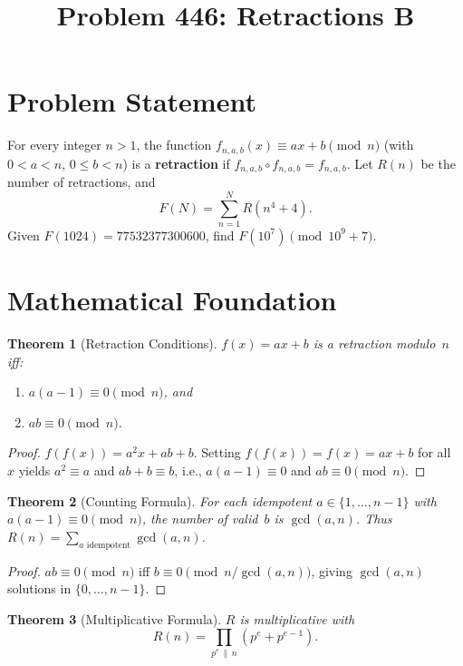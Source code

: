 \documentclass[12pt]{article}
\title{Problem 446: Retractions B}
\author{}
\date{}
\newtheorem{theorem}{Theorem}
\begin{document}
\maketitle

\section{Problem Statement}
For every integer $n > 1$, the function $f_{n,a,b}(x) \equiv ax + b \pmod{n}$ (with $0 < a < n$, $0 \le b < n$) is a \textbf{retraction} if $f_{n,a,b} \circ f_{n,a,b} = f_{n,a,b}$. Let $R(n)$ be the number of retractions, and
\[
F(N) = \sum_{n=1}^{N} R(n^4 + 4).
\]
Given $F(1024) = 77532377300600$, find $F(10^7) \pmod{10^9+7}$.

\section{Mathematical Foundation}

\begin{theorem}[Retraction Conditions]
$f(x) = ax + b$ is a retraction modulo~$n$ iff:
\begin{enumerate}
\item $a(a-1) \equiv 0 \pmod{n}$, and
\item $ab \equiv 0 \pmod{n}$.
\end{enumerate}
\end{theorem}

\begin{proof}
$f(f(x)) = a^2 x + ab + b$. Setting $f(f(x)) = f(x) = ax + b$ for all~$x$ yields $a^2 \equiv a$ and $ab + b \equiv b$, i.e., $a(a-1) \equiv 0$ and $ab \equiv 0 \pmod{n}$.
\end{proof}

\begin{theorem}[Counting Formula]
For each idempotent $a \in \{1, \ldots, n-1\}$ with $a(a-1) \equiv 0 \pmod{n}$, the number of valid~$b$ is $\gcd(a, n)$. Thus $R(n) = \sum_{a \text{ idempotent}} \gcd(a, n)$.
\end{theorem}

\begin{proof}
$ab \equiv 0 \pmod{n}$ iff $b \equiv 0 \pmod{n/\gcd(a,n)}$, giving $\gcd(a,n)$ solutions in $\{0, \ldots, n-1\}$.
\end{proof}

\begin{theorem}[Multiplicative Formula]
\label{thm:mult}
$R$ is multiplicative with
\[
R(n) = \prod_{p^e \,\|\, n} (p^e + p^{e-1}).
\]
\end{theorem}
\end{document}
